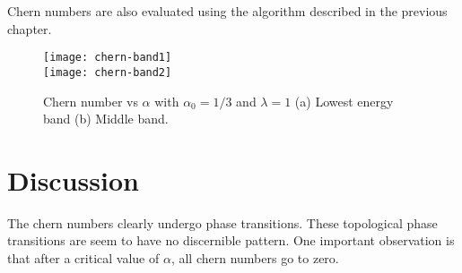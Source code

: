 Chern numbers are also evaluated using the algorithm described in the previous chapter.
\begin{figure}[h]
 \centering
 \texttt{[image: chern-band1]}\\
 \texttt{[image: chern-band2]}
 \caption{Chern number vs $\alpha$ with $\alpha_0=1/3$ and $\lambda=1$ (a) Lowest energy band (b) Middle band.}
\end{figure}
\section{Discussion}
The chern numbers clearly undergo phase transitions. These topological phase transitions are seem to have no discernible pattern. One important observation is that after a critical value
of $\alpha$, all chern numbers go to zero.